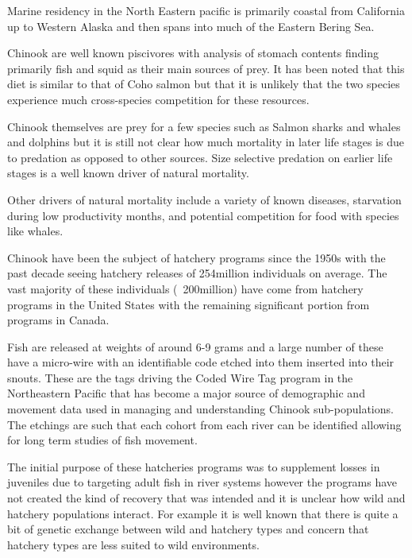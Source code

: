 \documentclass[11pt]{article}
\begin{document}
Marine residency in the North Eastern pacific is primarily coastal from California up to Western Alaska and then spans into much of the Eastern Bering Sea. \newline

Chinook are well known piscivores with analysis of stomach contents finding primarily fish and squid as their main sources of prey. It has been noted that this diet is similar to that of Coho salmon but that it is unlikely that the two species experience much cross-species competition for these resources. 

Chinook themselves are prey for a few species such as Salmon sharks and whales and dolphins but it is still not clear how much mortality in later life stages is due to predation as opposed to other sources. Size selective predation on earlier life stages is a well known driver of natural mortality. 

Other drivers of natural mortality include a variety of known diseases, starvation during low productivity months, and potential competition for food with species like whales.\newline

Chinook have been the subject of hatchery programs since the 1950s with the past decade seeing hatchery releases of 254million individuals on average. The vast majority of these individuals (~200million) have come from hatchery programs in the United States with the remaining significant portion from programs in Canada. 

Fish are released at weights of around 6-9 grams and a large number of these have a micro-wire with an identifiable code etched into them inserted into their snouts. These are the tags driving the Coded Wire Tag program in the Northeastern Pacific that has become a major source of demographic and movement data used in managing and understanding Chinook sub-populations. The etchings are such that each cohort from each river can be identified allowing for long term studies of fish movement. 

The initial purpose of these hatcheries programs was to supplement losses in juveniles due to targeting adult fish in river systems however the programs have not created the kind of recovery that was intended and it is unclear how wild and hatchery populations interact. For example it is well known that there is quite a bit of genetic exchange between wild and hatchery types and concern that hatchery types are less suited to wild environments. \newline
\end{document}
